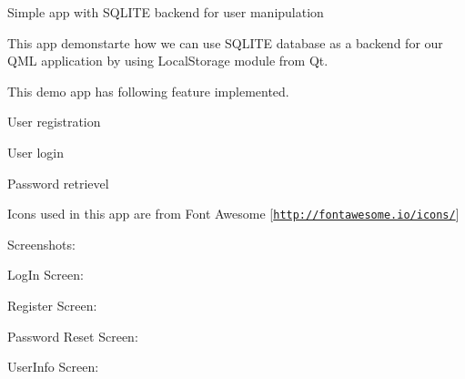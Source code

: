 Simple app with S\+Q\+L\+I\+TE backend for user manipulation

This app demonstarte how we can use S\+Q\+L\+I\+TE database as a backend for our Q\+ML application by using Local\+Storage module from Qt.

This demo app has following feature implemented.
\begin{DoxyItemize}
\item User registration
\item User login
\item Password retrievel
\end{DoxyItemize}

Icons used in this app are from Font Awesome \mbox{[}\href{http://fontawesome.io/icons/}{\tt http\+://fontawesome.\+io/icons/}\mbox{]}

Screenshots\+:

Log\+In Screen\+:



Register Screen\+:



Password Reset Screen\+:



User\+Info Screen\+:

 